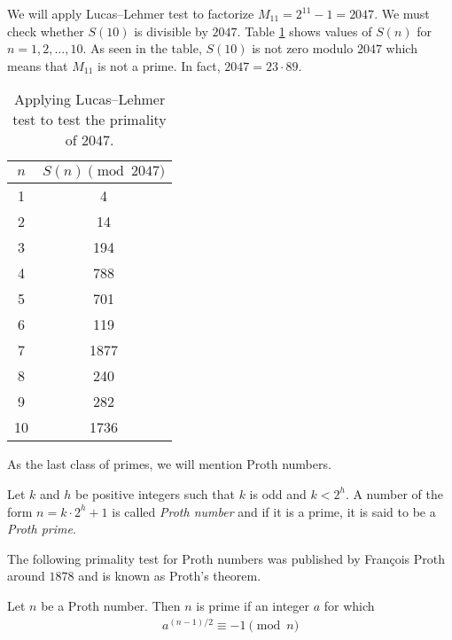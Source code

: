 \documentclass{subfiles}
\begin{document}
		\begin{example}
			We will apply Lucas--Lehmer test to factorize $M_{11}=2^{11}-1=2047$. We must check whether $S(10)$ is divisible by $2047$. Table \ref{table:lucas-lehmer} shows values of $S(n)$ for $n=1,2,\ldots,10$. As seen in the table, $S(10)$ is not zero modulo $2047$ which means that $M_{11}$ is not a prime. In fact, $2047=23 \cdot 89$.
			\begin{table}
				\centering
				\begin{tabular}{|c|c|}
				\hline
				$n$ & $S(n) \pmod {2047}$ \\
				\hline
				1 & 4 \\
				\hline
				2 & 14 \\
				\hline
				3 & 194 \\
				\hline
				4 & 788 \\
				\hline
				5 & 701 \\
				\hline
				6 & 119 \\
				\hline
				7 & 1877 \\
				\hline
				8 & 240 \\
				\hline
				9 & 282 \\
				\hline
				10 & 1736 \\
				\hline
			\end{tabular}
			\caption{Applying Lucas--Lehmer test to test the primality of $2047$.}
			\label{table:lucas-lehmer}
			\end{table}
		\end{example}

	As the last class of primes, we will mention Proth numbers.

		\begin{definition}
			Let $k$ and $h$ be positive integers such that $k$ is odd and $k < 2^h$. A number of the form $n=k \cdot 2^h +1$ is called \textit{Proth number} and if it is a prime, it is said to be a \textit{Proth prime}.
		\end{definition}

	The following primality test for Proth numbers was published by Fran\c cois Proth around $1878$ and is known as Proth's theorem.

		\begin{theorem}
			Let $n$ be a Proth number. Then $n$ is prime if an integer $a$ for which
				\begin{align*}
					a^{(n-1)/2} \equiv -1 \pmod n
				\end{align*}
		\end{theorem}
\end{document}
